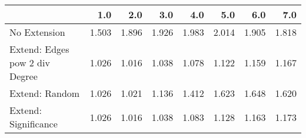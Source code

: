 \begin{tabular}{lrrrrrrr}
\toprule
{} &   1.0 &   2.0 &   3.0 &   4.0 &   5.0 &   6.0 &   7.0 \\
\midrule
No Extension                   & 1.503 & 1.896 & 1.926 & 1.983 & 2.014 & 1.905 & 1.818 \\
Extend: Edges pow 2 div Degree & 1.026 & 1.016 & 1.038 & 1.078 & 1.122 & 1.159 & 1.167 \\
Extend: Random                 & 1.026 & 1.021 & 1.136 & 1.412 & 1.623 & 1.648 & 1.620 \\
Extend: Significance           & 1.026 & 1.016 & 1.038 & 1.083 & 1.128 & 1.163 & 1.173 \\
\bottomrule
\end{tabular}
